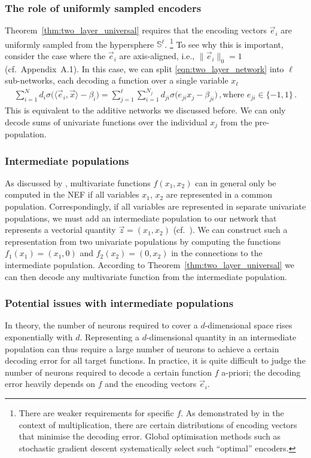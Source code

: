 \subsubsection{The role of uniformly sampled encoders}
Theorem~\ref{thm:two_layer_universal} requires that the encoding vectors $\vec e_i$ are uniformly sampled from the hypersphere $\mathbb{S}^\ell$.%
\footnote{There are weaker requirements for specific $f$.
As demonstrated by \citet{gosmann2015precise} in the context of multiplication, there are certain distributions of encoding vectors that minimise the decoding error.
Global optimisation methods such as stochastic gradient descent systematically select such \enquote{optimal} encoders.}
To see why this is important, consider the case where the $\vec e_i$ are axis-aligned, i.e., $\|\vec e_i\|_0 = 1$ (cf.~Appendix~A.1).
In this case, we can split \cref{eqn:two_layer_network} into $\ell$ sub-networks, each decoding a function over a single variable $x_\ell$
\begin{align*}
		\sum_{i = 1}^N d_i \sigma\bigl( \langle \vec e_i, \vec x \rangle - \beta_i \bigr)
	= 	\sum_{j = 1}^\ell \sum_{i = 1}^{N_j} d_{j i} \sigma\bigl( e_{j i} x_j - \beta_{j i} \bigr) \,, \text{where } e_{j i} \in \{ -1, 1\} \,.
\end{align*}
This is equivalent to the additive networks we discussed before.
We can only decode sums of univariate functions over the individual $x_j$ from the pre-population.

\subsubsection{Intermediate populations}
As discussed by \citet[Chapter~6]{eliasmith2003neural}, multivariate functions $f(x_1, x_2)$ can in general only be computed in the NEF if all variables $x_1$, $x_2$ are represented in a common population.
Correspondingly, if all variables are represented in separate univariate populations, we must add an intermediate population to our network that represents a vectorial quantity $\vec z = (x_1, x_2)$ (cf.~).
We can construct such a representation from two univariate populations by computing the functions $f_1(x_1) = (x_1, 0)$ and $f_2(x_2) = (0, x_2)$ in the connections to the intermediate population.
According to Theorem~\ref{thm:two_layer_universal} we can then decode any multivariate function from the intermediate population.

\subsubsection{Potential issues with intermediate populations}
In theory, the number of neurons required to cover a $d$-dimensional space rises exponentially with $d$.
Representing a $d$-dimensional quantity in an intermediate population can thus require a large number of neurons to achieve a certain decoding error for all target functions.
In practice, it is quite difficult to judge the number of neurons required to decode a certain function $f$ a-priori; the decoding error heavily depends on $f$ and the encoding vectors $\vec e_i$.

